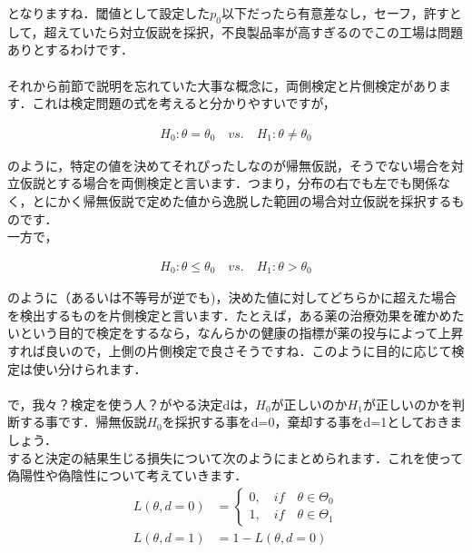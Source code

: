 \documentclass[11pt,a4paper]{ujreport} 	%
\begin{document}
となりますね．閾値として設定した$p_0$以下だったら有意差なし，セーフ，許すとして，超えていたら対立仮説を採択，不良製品率が高すぎるのでこの工場は問題ありとするわけです．\\
\\

それから前節で説明を忘れていた大事な概念に，両側検定と片側検定があります．これは検定問題の式を考えると分かりやすいですが，

\begin{align}
  H_0:\theta = \theta_0\quad vs. \quad H_1:\theta \neq \theta_0
\end{align}

のように，特定の値を決めてそれぴったしなのが帰無仮説，そうでない場合を対立仮説とする場合を両側検定と言います．つまり，分布の右でも左でも関係なく，とにかく帰無仮説で定めた値から逸脱した範囲の場合対立仮説を採択するものです．\\

一方で，

\begin{align}
  H_0:\theta \leq \theta_0 \quad vs. \quad H_1 : \theta > \theta_0
\end{align}

のように（あるいは不等号が逆でも)，決めた値に対してどちらかに超えた場合を検出するものを片側検定と言います．たとえば，ある薬の治療効果を確かめたいという目的で検定をするなら，なんらかの健康の指標が薬の投与によって上昇すれば良いので，上側の片側検定で良さそうですね．このように目的に応じて検定は使い分けられます．\\\\

で，我々？検定を使う人？がやる決定dは，$H_0$が正しいのか$H_1$が正しいのかを判断する事です．帰無仮説$H_0$を採択する事をd=0，棄却する事をd=1としておきましょう．\\

すると決定の結果生じる損失について次のようにまとめられます．これを使って偽陽性や偽陰性について考えていきます．\\


\begin{align}
  L(\theta, d=0) &= \left\{
    \begin{array}{l}
    0, \quad if \quad \theta \in \Theta_0\\
    1, \quad if \quad \theta \in \Theta_1
    \end{array}
  \right.\nonumber \\
  L(\theta, d=1) &= 1-L(\theta, d=0) 
  \label{eq:cost}
\end{align}
\end{document}
